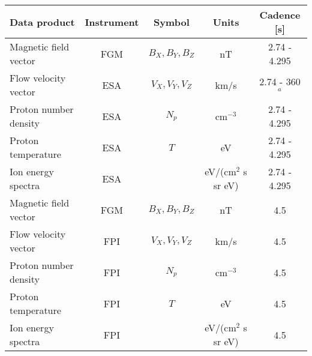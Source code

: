 \begin{tabular}{lcccc}
\hline
Data product            & Instrument & Symbol           & Units        & Cadence [s] \\
\hline
Magnetic field vector 	& FGM      & $B_X, B_Y, B_Z$  & nT                     & 2.74 - 4.295 \\
Flow velocity vector  	& ESA       & $V_X, V_Y, V_Z$  & km/s                  & 2.74 - 360$^a$ \\
Proton number density	& ESA       & $N_p$            	& cm$^{-3}$            & 2.74 - 4.295 \\
Proton temperature    	& ESA       & $T$            	& eV                   & 2.74 - 4.295 \\
Ion energy spectra    	& ESA       &                  	& eV/(cm$^2$ s sr eV)  & 2.74 - 4.295 \\
\hline
Magnetic field vector 	& FGM      & $B_X, B_Y, B_Z$  & nT                    & 4.5 \\
Flow velocity vector  	& FPI      & $V_X, V_Y, V_Z$  & km/s                  & 4.5 \\
Proton number density 	& FPI      & $N_p$            & cm$^{-3}$             & 4.5 \\
Proton temperature    	& FPI      & $T$              & eV                    & 4.5 \\
Ion energy spectra   	& FPI      &                  & eV/(cm$^2$ s sr eV)   & 4.5 \\
\hline
\end{tabular}